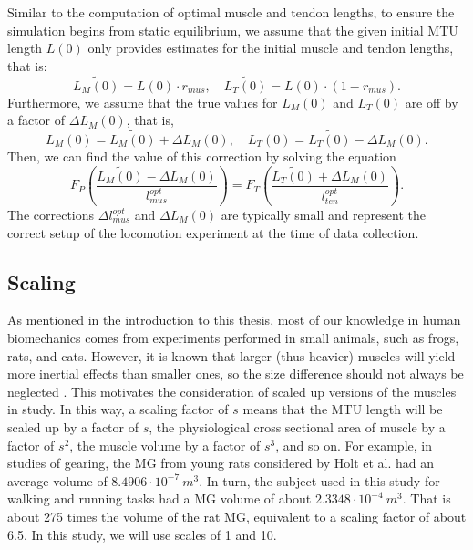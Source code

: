 \documentclass{sfuthesis}
\numberwithin{equation}{chapter}
\numberwithin{figure}{chapter}
\numberwithin{table}{chapter}
\theoremstyle{definition}
\begin{document}
Similar to the computation of optimal muscle and tendon lengths, to ensure the simulation begins from static equilibrium, we assume that the given initial MTU length $L(0)$ only provides estimates for the initial muscle and tendon lengths, that is:
\begin{equation}
    \widetilde{L_M(0)} = L(0) \cdot r_{mus}, \quad \widetilde{L_T(0)} = L(0) \cdot (1-r_{mus}).
\end{equation}
Furthermore, we assume that the true values for $L_M(0)$ and $L_T(0)$ are off by a factor of $\Delta L_M(0)$, that is, 
\begin{equation}
    L_M(0) =  \widetilde{L_M(0)} + \Delta L_M(0), \quad L_T(0) = \widetilde{L_T(0)} - \Delta L_M(0).
\end{equation}
Then, we can find the value of this correction by solving the equation
\begin{equation} \label{eq:calibration_2}
    F_P \left( \dfrac{\widetilde{L_M(0)} - \Delta L_M(0)}{l_{mus}^{opt}}\right) = F_T \left( \dfrac{\widetilde{L_T(0)} + \Delta L_M(0)}{l_{ten}^{opt}}\right).
\end{equation}
The corrections $\Delta l_{mus}^{opt}$ and $\Delta L_M(0)$ are typically small and represent the correct setup of the locomotion experiment at the time of data collection.

\subsection{Scaling}

As mentioned in the introduction to this thesis, most of our knowledge in human biomechanics comes from experiments performed in small animals, such as frogs, rats, and cats. 
However, it is known that larger (thus heavier) muscles will yield more inertial effects than smaller ones, so the size difference should not always be neglected \cite{EvanThesis,Ross2018}. This motivates the consideration of scaled up versions of the muscles in study. In this way, a scaling factor of $s$ means that the MTU length will be scaled up by a factor of $s$, the physiological cross sectional area of muscle by a factor of $s^2$, the muscle volume by a factor of $s^3$, and so on. For example, in studies of gearing, the MG from young rats considered by Holt et al. \cite{Holt2016} had an average volume of $8.4906 \cdot 10^{-7} \ m^3$. In turn, the subject used in this study for walking and running tasks had a MG volume of about $2.3348 \cdot 10^{-4} \ m^3$. That is about 275 times the volume of the rat MG, equivalent to a scaling factor of about 6.5. In this study, we will use scales of 1 and 10.
\end{document}
